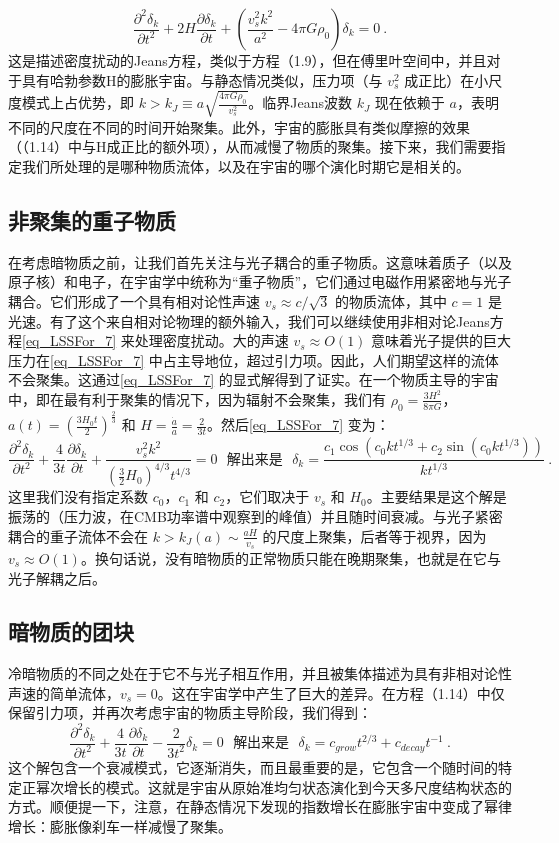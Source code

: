\begin{equation}\label{eq_LSSFor_7} \frac{\partial^2 \delta_k}{\partial t^2} + 2H \frac{\partial \delta_k}{\partial t} + \left( \frac{v_s^2 k^2}{a^2} - 4\pi G\rho_0 \right) \delta_k = 0~. 
\end{equation}
这是描述密度扰动的Jeans方程，类似于方程（1.9），但在傅里叶空间中，并且对于具有哈勃参数H的膨胀宇宙。与静态情况类似，压力项（与 \( v_s^2 \) 成正比）在小尺度模式上占优势，即 \( k > k_J \equiv a \sqrt{\frac{4\pi G\rho_0}{v_s^2}} \)。临界Jeans波数 \( k_J \) 现在依赖于 \( a \)，表明不同的尺度在不同的时间开始聚集。此外，宇宙的膨胀具有类似摩擦的效果（（1.14）中与H成正比的额外项），从而减慢了物质的聚集。接下来，我们需要指定我们所处理的是哪种物质流体，以及在宇宙的哪个演化时期它是相关的。

\subsection{非聚集的重子物质}

在考虑暗物质之前，让我们首先关注与光子耦合的重子物质。这意味着质子（以及原子核）和电子，在宇宙学中统称为“重子物质”，它们通过电磁作用紧密地与光子耦合。它们形成了一个具有相对论性声速 \( v_s \approx c/\sqrt{3} \) 的物质流体，其中 \( c = 1 \) 是光速。有了这个来自相对论物理的额外输入，我们可以继续使用非相对论Jeans方程\autoref{eq_LSSFor_7} 来处理密度扰动。大的声速 \( v_s \approx O(1) \) 意味着光子提供的巨大压力在\autoref{eq_LSSFor_7} 中占主导地位，超过引力项。因此，人们期望这样的流体不会聚集。这通过\autoref{eq_LSSFor_7} 的显式解得到了证实。在一个物质主导的宇宙中，即在最有利于聚集的情况下，因为辐射不会聚集，我们有 \( \rho_0 = \frac{3H^2}{8\pi G} \)，\( a(t) = \left(\frac{3H_0 t}{2}\right)^{\frac{2}{3}} \) 和 \( H = \frac{\dot{a}}{a} = \frac{2}{3t} \)。然后\autoref{eq_LSSFor_7} 变为：
\[ \frac{\partial^2 \delta_k}{\partial t^2} + \frac{4}{3t} \frac{\partial \delta_k}{\partial t} + \frac{v_s^2 k^2}{(\frac{3}{2}H_0)^{4/3}t^{4/3}} = 0 \,\,\,\,\text{解出来是} \,\,\,\,\delta_k = \frac{c_1 \cos (c_0 k t^{1/3}+c_2\sin(c_0 k t^{1/3}))}{k t^{1/3}}~. \]
这里我们没有指定系数 \( c_0 \)，\( c_1 \) 和 \( c_2 \)，它们取决于 \( v_s \) 和 \( H_0 \)。主要结果是这个解是振荡的（压力波，在CMB功率谱中观察到的峰值）并且随时间衰减。与光子紧密耦合的重子流体不会在 \( k > k_J(a) \sim \frac{aH}{v_s} \) 的尺度上聚集，后者等于视界，因为 \( v_s \approx O(1) \)。换句话说，没有暗物质的正常物质只能在晚期聚集，也就是在它与光子解耦之后。

\subsection{暗物质的团块}
冷暗物质的不同之处在于它不与光子相互作用，并且被集体描述为具有非相对论性声速的简单流体，\( v_s = 0 \)。这在宇宙学中产生了巨大的差异。在方程（1.14）中仅保留引力项，并再次考虑宇宙的物质主导阶段，我们得到：
\[ \frac{\partial^2 \delta_k}{\partial t^2} + \frac{4}{3t} \frac{\partial \delta_k}{\partial t} - \frac{2}{3t^2} \delta_k = 0 \,\,\,\, \text{解出来是} \,\,\,\,\delta_k = c_{grow} t^{2/3}+c_{decay} t^{-1}~. \]
这个解包含一个衰减模式，它逐渐消失，而且最重要的是，它包含一个随时间的特定正幂次增长的模式。这就是宇宙从原始准均匀状态演化到今天多尺度结构状态的方式。顺便提一下，注意，在静态情况下发现的指数增长在膨胀宇宙中变成了幂律增长：膨胀像刹车一样减慢了聚集。

